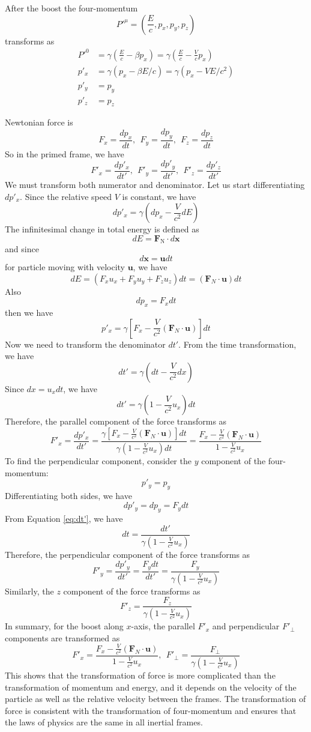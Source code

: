 \documentclass[12pt]{article}
\begin{document}
After the boost the four-momentum 
\[
P'^\mu = \left(\frac{E}{c}, p_x, p_y, p_z\right)
\]
transforms as
\begin{align*}
    P'^0 &= \gamma\left(\frac{E}{c} - \beta p_x\right) = \gamma\left(\frac{E}{c} - \frac{V}{c}p_x\right)\\
    p'_x &= \gamma(p_x - \beta E/c) = \gamma(p_x -  VE/c^2)\\
    p'_y &= p_y\\
    p'_z &= p_z
\end{align*}


Newtonian force is
\[
F_x = \frac{dp_x}{dt}, ~~ F_y = \frac{dp_y}{dt}, ~~ F_z = \frac{dp_z}{dt}
\]
So in the primed frame, we have
\[
F'_x = \frac{dp'_x}{dt'}, ~~ F'_y = \frac{dp'_y}{dt'}, ~~ F'_z = \frac{dp'_z}{dt'}
\]
We must transform both numerator and denominator. Let us start differentiating $dp'_x$. Since the relative speed $V$ is constant, we have
\[
dp'_x = \gamma\left(dp_x - \frac{V}{c^2}dE\right) 
\] 
The infinitesimal change in total energy is defined as
\[
dE = \mathbf{F}_\text{N} \cdot d\mathbf{x}
\]
and since
\[d\mathbf{x} = \mathbf{u} dt
\]
for particle moving with velocity $\mathbf{u}$, we have
\[
dE = (F_x u_x + F_y u_y + F_z u_z) dt = \left( \mathbf{F}_N \cdot \mathbf{u} \right) dt
\]
Also
\[
dp_x = F_x dt
\]
then we have
\[
p'_x = \gamma\left[F_x - \frac{V}{c^2} \left( \mathbf{F}_N \cdot \mathbf{u}\right)\right] dt
\]
Now we need to transform the denominator $dt'$. From the time transformation, we have
\[
dt' = \gamma\left(dt - \frac{V}{c^2}dx\right) 
\]
Since $dx = u_x dt$, we have
\begin{equation}
dt' = \gamma\left(1 - \frac{V}{c^2}u_x\right) dt
\label{eq:dt'}
\end{equation}
Therefore, the parallel component of the force transforms as
\[
F'_x = \frac{dp'_x}{dt'} = \frac{\gamma\left[F_x - \frac{V}{c^2} \left( \mathbf{F}_N \cdot \mathbf{u}\right)\right] dt}{\gamma\left(1 - \frac{V}{c^2}u_x\right) dt} = \frac{F_x - \frac{V}{c^2} \left( \mathbf{F}_N \cdot \mathbf{u}\right)}{1 - \frac{V}{c^2}u_x}
\]
To find the perpendicular component, consider the $y$ component of the four-momentum:
\[
p'_y = p_y
\]
Differentiating both sides, we have
\[
dp'_y = dp_y = F_y dt
\]
From Equation \ref{eq:dt'}, we have
\[
dt = \frac{dt'}{\gamma\left(1 - \frac{V}{c^2}u_x\right)}
\]
Therefore, the perpendicular component of the force transforms as
\[
F'_y = \frac{dp'_y}{dt'} = \frac{F_y dt}{dt'} = \frac{F_y}{\gamma\left(1 - \frac{V}{c^2}u_x\right)}
\]
Similarly, the $z$ component of the force transforms as
\[
F'_z = \frac{F_z}{\gamma\left(1 - \frac{V}{c^2}u_x\right)}
\]
In summary, for the boost along $x$-axis, the parallel $F'_x$ and perpendicular $F'_\perp$ components are transformed as
\[
F'_x = \frac{F_x - \frac{V}{c^2} \left( \mathbf{F}_N \cdot \mathbf{u}\right)}{1 - \frac{V}{c^2}u_x}, ~~ F'_\perp = \frac{F_\perp}{\gamma\left(1 - \frac{V}{c^2}u_x\right)}
\]
This shows that the transformation of force is more complicated than the transformation of momentum and energy, and it depends on the velocity of the particle as well as the relative velocity between the frames. The transformation of force is consistent with the transformation of four-momentum and ensures that the laws of physics are the same in all inertial frames.
\end{document}

